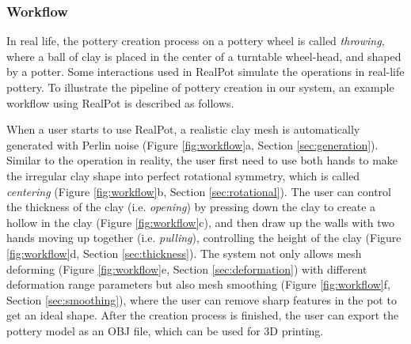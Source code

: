 \documentclass{svjour3}                     %
\begin{document}
\subsubsection{Workflow}
\label{sec:workflow}
In real life, the pottery creation process on a pottery wheel is called \textit{throwing}, where a ball of clay is placed in the center of a turntable wheel-head, and shaped by a potter.
Some interactions used in RealPot simulate the operations in real-life pottery.
To illustrate the pipeline of pottery creation in our system, an example workflow using RealPot is described as follows.

When a user starts to use RealPot, a realistic clay mesh is automatically generated with Perlin noise (Figure \ref{fig:workflow}a, Section \ref{sec:generation}). 
Similar to the operation in reality, the user first need to use both hands to make the irregular clay shape into perfect rotational symmetry, which is called \textit{centering} (Figure \ref{fig:workflow}b, Section \ref{sec:rotational}).
The user can control the thickness of the clay (i.e. \textit{opening}) by pressing down the clay to create a hollow in the clay (Figure \ref{fig:workflow}c), 
and then draw up the walls with two hands moving up together (i.e. \textit{pulling}), controlling the height of the clay (Figure \ref{fig:workflow}d, Section \ref{sec:thickness}).
The system not only allows mesh deforming (Figure \ref{fig:workflow}e, Section \ref{sec:deformation}) with different deformation range parameters but also mesh smoothing (Figure \ref{fig:workflow}f, Section \ref{sec:smoothing}), where the user can remove sharp features in the pot to get an ideal shape.
After the creation process is finished, the user can export the pottery model as an OBJ file, which can be used for 3D printing.
\end{document}
